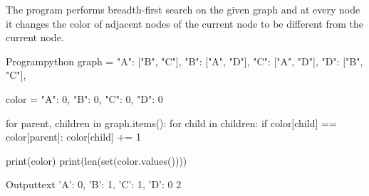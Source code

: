\documentclass[11pt]{ipu-ai}
\begin{document}
    \newpage%


    {The program performs breadth-first search on the given graph and at every node it changes the color of adjacent
    nodes of the current node to be different from the current node.%
        \begin{center}%
        \end{center}\vspace*{2pt}%
    }%
    \begin{code}
        {Program}{python}
graph = {
    "A": ["B", "C"],
    "B": ["A", "D"],
    "C": ["A", "D"],
    "D": ["B", "C"],
}

color = {
    "A": 0,
    "B": 0,
    "C": 0,
    "D": 0
}

for parent, children in graph.items():
    for child in children:
        if color[child] == color[parent]:
            color[child] += 1

print(color)
print(len(set(color.values())))
    \end{code}
    \begin{code}
        {Output}{text}
{'A': 0, 'B': 1, 'C': 1, 'D': 0}
2
    \end{code}
\end{document}
